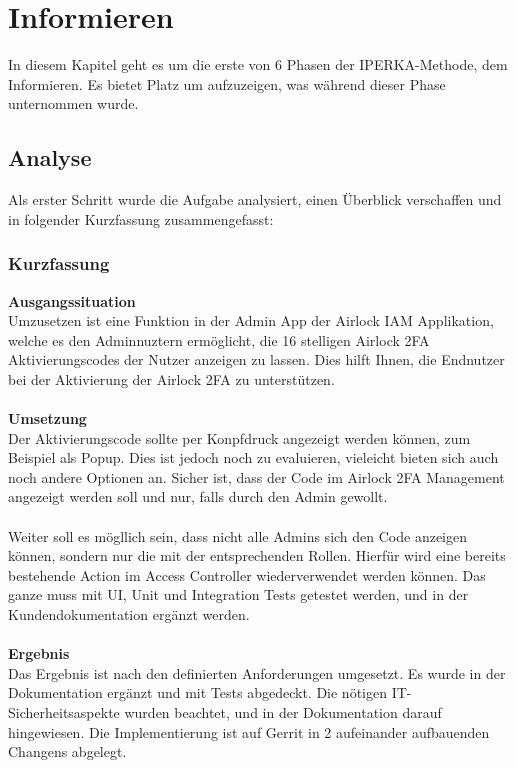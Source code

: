 \chapter{Informieren}\label{ch:informieren}

In diesem Kapitel geht es um die erste von 6 Phasen der IPERKA-Methode, dem Informieren. Es bietet Platz um aufzuzeigen, was während dieser Phase unternommen wurde.

\section{Analyse}
Als erster Schritt wurde die Aufgabe analysiert, einen Überblick verschaffen und in folgender Kurzfassung zusammengefasst:
\subsection {Kurzfassung}
\textbf{Ausgangssituation}\\
Umzusetzen ist eine Funktion in der Admin App der Airlock IAM Applikation, welche es den Adminnuztern ermöglicht, die 16 stelligen Airlock 2FA Aktivierungscodes der Nutzer anzeigen zu lassen. Dies hilft Ihnen, die Endnutzer bei der Aktivierung der Airlock 2FA zu unterstützen.\\
\\
\textbf{Umsetzung}\\
Der Aktivierungscode sollte per Konpfdruck angezeigt werden können, zum Beispiel als Popup. Dies ist jedoch noch zu evaluieren, vieleicht bieten sich auch noch andere Optionen an. Sicher ist, dass der Code im Airlock 2FA Management angezeigt werden soll und nur, falls durch den Admin gewollt. 
 \\\\
Weiter soll es mögllich sein, dass nicht alle Admins sich den Code anzeigen können, sondern nur die mit der entsprechenden Rollen. Hierfür wird eine bereits bestehende Action im Access Controller wiederverwendet werden können. Das ganze muss mit UI, Unit und Integration Tests getestet werden, und in der Kundendokumentation ergänzt werden.\\
\\
\textbf{Ergebnis}\\
Das Ergebnis ist nach den definierten Anforderungen umgesetzt. Es wurde in der Dokumentation ergänzt und mit Tests abgedeckt. Die nötigen IT-Sicherheitsaspekte wurden beachtet, und in der Dokumentation darauf hingewiesen. Die Implementierung ist auf Gerrit in 2 aufeinander aufbauenden Changens abgelegt.
\newpage
